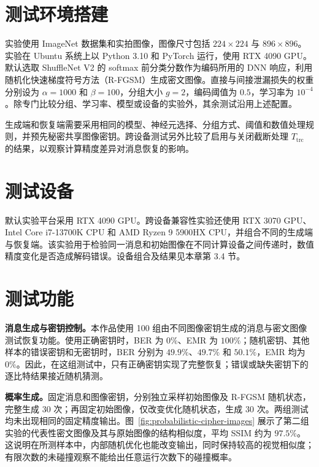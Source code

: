 \documentclass[UTF8,a4paper,zihao=-4,fontset=windows,openany]{ctexbook}
\begin{document}
\section{测试环境搭建}

实验使用 ImageNet 数据集和实拍图像，图像尺寸包括 $224\times224$ 与 $896\times896$。实验在 Ubuntu 系统上以 Python 3.10 和 PyTorch 运行，使用 RTX 4090 GPU。默认选取 ShuffleNet V2 的 softmax 前分类分数作为编码所用的 DNN 响应，利用随机化快速梯度符号方法（R-FGSM）生成密文图像。直接与间接泄漏损失的权重分别设为 $\alpha=1000$ 和 $\beta=100$，分组大小 $g=2$，编码阈值为 $0.5$，学习率为 $10^{-4}$。除专门比较分组、学习率、模型或设备的实验外，其余测试沿用上述配置。

生成端和恢复端需要采用相同的模型、神经元选择、分组方式、阈值和数值处理规则，并预先秘密共享图像密钥。跨设备测试另外比较了启用与关闭截断处理 $T_{\mathrm{trc}}$ 的结果，以观察计算精度差异对消息恢复的影响。

\section{测试设备}

默认实验平台采用 RTX 4090 GPU。跨设备兼容性实验还使用 RTX 3070 GPU、Intel Core i7-13700K CPU 和 AMD Ryzen 9 5900HX CPU，并组合不同的生成端与恢复端。该实验用于检验同一消息和初始图像在不同计算设备之间传递时，数值精度变化是否造成解码错误。设备组合及结果见本章第 3.4 节。

\section{测试功能}

\textbf{消息生成与密钥控制。}本作品使用 100 组由不同图像密钥生成的消息与密文图像测试恢复功能。使用正确密钥时，BER 为 $0\%$、EMR 为 $100\%$；随机密钥、其他样本的错误密钥和无密钥时，BER 分别为 $49.9\%$、$49.7\%$ 和 $50.1\%$，EMR 均为 $0\%$。因此，在这组测试中，只有正确密钥实现了完整恢复；错误或缺失密钥下的逐比特结果接近随机猜测。

\textbf{概率生成。}固定消息和图像密钥，分别独立采样初始图像及 R-FGSM 随机状态，完整生成 30 次；再固定初始图像，仅改变优化随机状态，生成 30 次。两组测试均未出现相同的固定精度输出。图~\ref{fig:probabilistic-cipher-images} 展示了第二组实验的代表性密文图像及其与原始图像的结构相似度，平均 SSIM 约为 $97.5\%$。这说明在所测样本中，内部随机优化也能改变输出，同时保持较高的视觉相似度；有限次数的未碰撞观察不能给出任意运行次数下的碰撞概率。
\end{document}
